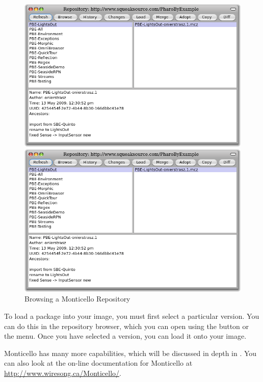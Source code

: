 \documentclass[a4paper,10pt,twoside]{book}
\begin{document}
\begin{figure}[hbt]
\ifluluelse
	{\centerline {\includegraphics[width=\textwidth]{BrowseRepository}}}
	{\centerline {\includegraphics[scale=0.7]{BrowseRepository}}}
\caption{Browsing a Monticello Repository
}
\end{figure}


To load a package into your image, you must first select a particular version.  You can do this in the repository browser, which you can open using the  button or the \actclick menu.  Once you have selected a version, you can load it onto your image.


Monticello has many more capabilities, which will be discussed in depth in .
You can also look at the on-line documentation for Monticello at \url{http://www.wiresong.ca/Monticello/}.
\end{document}
